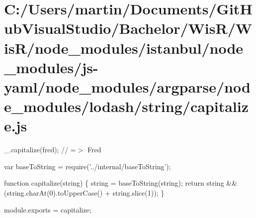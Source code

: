 \hypertarget{_c_1_2_users_2martin_2_documents_2_git_hub_visual_studio_2_bachelor_2_wis_r_2_wis_r_2node_modulefcd1af4fa467d05b6ab9c6a316b4a9a5}{}\section{C\+:/\+Users/martin/\+Documents/\+Git\+Hub\+Visual\+Studio/\+Bachelor/\+Wis\+R/\+Wis\+R/node\+\_\+modules/istanbul/node\+\_\+modules/js-\/yaml/node\+\_\+modules/argparse/node\+\_\+modules/lodash/string/capitalize.\+js}
\+\_\+.\+capitalize(\textquotesingle{}fred\textquotesingle{}); // =$>$ \textquotesingle{}Fred\textquotesingle{}


\begin{DoxyCodeInclude}
var baseToString = require(\textcolor{stringliteral}{'../internal/baseToString'});

\textcolor{keyword}{function} capitalize(\textcolor{keywordtype}{string}) \{
  \textcolor{keywordtype}{string} = baseToString(\textcolor{keywordtype}{string});
  \textcolor{keywordflow}{return} \textcolor{keywordtype}{string} && (\textcolor{keywordtype}{string}.charAt(0).toUpperCase() + \textcolor{keywordtype}{string}.slice(1));
\}

module.exports = capitalize;
\end{DoxyCodeInclude}
 